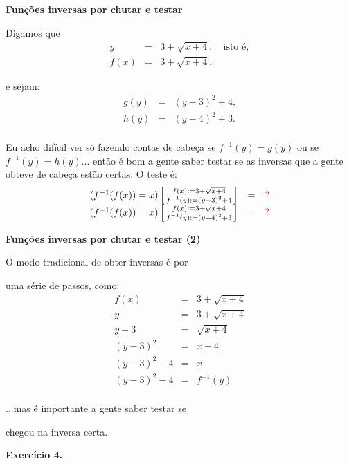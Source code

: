 \documentclass[oneside,12pt]{article}
\begin{document}
{\bf Funções inversas por chutar e testar}

Digamos que 
%
$$\begin{array}{rcl}
  y &=& 3 + \sqrt{x+4}, \quad \text{isto é}, \\
  f(x) &=& 3 + \sqrt{x+4},
  \end{array}
$$

e sejam:
%
$$\begin{array}{rcl}
  g(y) &=& (y-3)^2 + 4, \\
  h(y) &=& (y-4)^2 + 3. \\
  \end{array}
$$

Eu acho difícil ver só fazendo contas de cabeça se $f^{-1}(y) = g(y)$
ou se $f^{-1}(y) = h(y)$... então é bom a gente saber testar se as
inversas que a gente obteve de cabeça estão certas. O teste é:
%
$$\begin{array}{rcl}
  (f^{-1}(f(x)) = x) \bsm{ f(x) := 3 + \sqrt{x+4} \\ f^{-1}(y) := (y-3)^2 + 4 } &=& \ColorRed{?} \\
  (f^{-1}(f(x)) = x) \bsm{ f(x) := 3 + \sqrt{x+4} \\ f^{-1}(y) := (y-4)^2 + 3 } &=& \ColorRed{?} \\
  \end{array}
$$


\newpage


{\bf Funções inversas por chutar e testar (2)}

O modo tradicional de obter inversas é por

uma série de passos, como:
%
$$\begin{array}{rcl}
  f(x) &=& 3 + \sqrt{x+4} \\
  y &=& 3 + \sqrt{x+4} \\
  y - 3 &=& \sqrt{x+4} \\
  (y - 3)^2 &=& x+4 \\
  (y - 3)^2 - 4 &=& x \\
  (y - 3)^2 - 4 &=& f^{-1}(y) \\
  \end{array}
$$

...mas é importante a gente saber testar se

chegou na inversa certa.


\newpage


{\bf Exercício 4.} 
\end{document}
